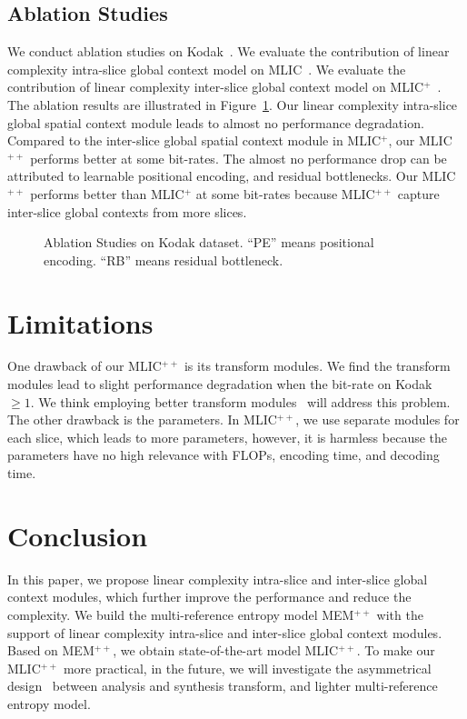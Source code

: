 \documentclass{article}
\theoremstyle{plain}
\theoremstyle{definition}
\theoremstyle{remark}
\begin{document}
  \subsection{Ablation Studies}
  \label{sec:ablation}
  We conduct ablation studies on Kodak~\cite{kodak}.
  We evaluate the contribution of linear complexity intra-slice global context model
  on MLIC~\cite{jiang2022mlic}.
  We evaluate the contribution of linear complexity inter-slice global
  context model on MLIC$^+$~\cite{jiang2022mlic}.
  The ablation results are illustrated in Figure~\ref{fig:ablation}.
  Our linear complexity intra-slice global spatial context module 
  leads to almost no performance degradation.
  Compared to the inter-slice global spatial context module in
  MLIC$^+$, our MLIC$^{++}$ performs better at some bit-rates.
  The almost no performance drop can be attributed to learnable positional encoding, 
  and residual bottlenecks. 
  Our MLIC$^{++}$ performs better than MLIC$^+$ at some bit-rates because MLIC$^{++}$ capture 
  inter-slice global contexts from more slices.
  \begin{figure}[t]
      \centering
      \caption{Ablation Studies on Kodak dataset. “PE” means positional encoding.
      “RB” means residual bottleneck.}
      \label{fig:ablation}
    \end{figure}
  \section{Limitations}
  \label{sec:limit}
  One drawback of our MLIC$^{++}$ is its transform modules.
  We find the transform modules lead to slight
  performance degradation when the bit-rate on Kodak~\cite{kodak} $\geq 1$.
  We think employing better transform modules~\cite{jiang2023slic,he2022elic,zou2022the,zhu2022transformerbased}
  will address this problem.
  The other drawback is the parameters. In MLIC$^{++}$,
  we use separate modules for each slice, which leads to more parameters, however, it is harmless because the parameters have no
  high relevance with FLOPs, encoding time, and decoding time.
  \section{Conclusion}
  \label{sec:conclusion}
  In this paper, we propose linear complexity intra-slice and inter-slice
  global context modules, which further improve the performance and 
  reduce the complexity.
  We build the multi-reference entropy model MEM$^{++}$ with 
  the support of linear complexity intra-slice and inter-slice global
  context modules.
  Based on MEM$^{++}$, we obtain state-of-the-art model MLIC$^{++}$. 
  To make our MLIC$^{++}$ more practical,
  in the future, we will investigate the asymmetrical design~\cite{yang2023asymmetrically}
  between analysis and synthesis transform, and lighter multi-reference entropy model.


\nocite{langley00}





\newpage
\appendix
\onecolumn
\end{document}
